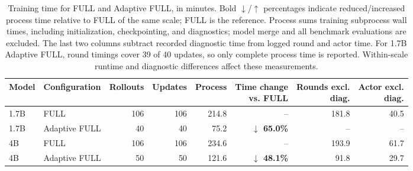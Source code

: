 \begin{table}[t]
\centering
\caption{Training time for FULL and Adaptive FULL, in minutes. Bold $\downarrow$/$\uparrow$ percentages indicate reduced/increased process time relative to FULL of the same scale; FULL is the reference. Process sums training subprocess wall times, including initialization, checkpointing, and diagnostics; model merge and all benchmark evaluations are excluded. The last two columns subtract recorded diagnostic time from logged round and actor time. For 1.7B Adaptive FULL, round timings cover 39 of 40 updates, so only complete process time is reported. Within-scale runtime and diagnostic differences affect these measurements.}
\label{tab:training_time_overview}
\small
\setlength{\tabcolsep}{3pt}
\begin{tabular}{llrrrrrr}
\toprule
Model & Configuration & Rollouts & Updates & Process & \shortstack{Time change\\vs. FULL} & \shortstack{Rounds excl.\\diag.} & \shortstack{Actor excl.\\diag.} \\
\midrule
1.7B & FULL & 106 & 106 & 214.8 & -- & 181.8 & 40.5 \\
1.7B & Adaptive FULL & 40 & 40 & 75.2 & \textbf{$\downarrow$ 65.0\%} & -- & -- \\
4B & FULL & 106 & 106 & 234.6 & -- & 193.9 & 61.7 \\
4B & Adaptive FULL & 50 & 50 & 121.6 & \textbf{$\downarrow$ 48.1\%} & 91.8 & 29.7 \\
\bottomrule
\end{tabular}
\end{table}
